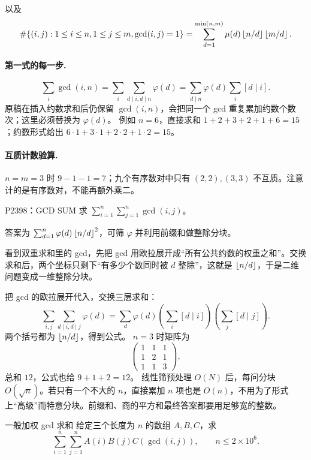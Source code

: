 以及
\[
 \#\{(i,j):1\le i\le n,1\le j\le m,\gcd(i,j)=1\}
 =\sum_{d=1}^{\min(n,m)}\mu(d)\left\lfloor n/d\right\rfloor\left\lfloor m/d\right\rfloor.
\]

\paragraph{第一式的每一步.}
\[
\sum_i\gcd(i,n)
=\sum_i\sum_{d\mid i,d\mid n}\varphi(d)
=\sum_{d\mid n}\varphi(d)\sum_i[d\mid i].
\]
原稿在插入约数求和后仍保留 $\gcd(i,n)$，会把同一个 gcd 重复累加约数个数次；这里必须替换为 $\varphi(d)$。
例如 $n=6$，直接求和 $1+2+3+2+1+6=15$；约数形式给出 $6\cdot1+3\cdot1+2\cdot2+1\cdot2=15$。
\paragraph{互质计数验算.} $n=m=3$ 时 $9-1-1=7$；九个有序数对中只有 $(2,2),(3,3)$ 不互质。注意计的是有序数对，不能再额外乘二。


\begin{problem}{P2398：GCD SUM}
求 $\sum_{i=1}^n\sum_{j=1}^n\gcd(i,j)$。
\end{problem}
\hint 答案为 $\sum_{d=1}^n\varphi(d)\left\lfloor n/d\right\rfloor^2$，可筛 $\varphi$ 并利用前缀和做整除分块。

\begin{pitfall}[讲解：先看这题到底在做什么]
看到双重求和里的 gcd，先把 gcd 用欧拉展开成“所有公共约数的权重之和”。交换求和后，两个坐标只剩下“有多少个数同时被 $d$ 整除”，这就是 $\left\lfloor n/d\right\rfloor$，于是二维问题变成一维整除分块。
\end{pitfall}

\sol 把 gcd 的欧拉展开代入，交换三层求和：
\[
\sum_{i,j}\sum_{d\mid i,d\mid j}\varphi(d)
=\sum_d\varphi(d)\left(\sum_i[d\mid i]\right)
\left(\sum_j[d\mid j]\right).
\]
两个括号都为 $\left\lfloor n/d\right\rfloor$，得到公式。
$n=3$ 时矩阵为
\[
\begin{pmatrix}1&1&1\\1&2&1\\1&1&3\end{pmatrix},
\]
总和 $12$，公式也给 $9+1+2=12$。
\cost 线性筛预处理 $O(N)$ 后，每问分块 $O(\sqrt n)$。若只有一个不大的 $n$，直接累加 $n$ 项也是 $O(n)$，不用为了形式上“高级”而特意分块。前缀和、商的平方和最终答案都要用足够宽的整数。


\begin{problem}{一般加权 gcd 求和}
给定三个长度为 $n$ 的数组 $A,B,C$，求
\[
 \sum_{i=1}^n\sum_{j=1}^n A(i)B(j)C(\gcd(i,j)),\qquad n\le2\times10^6.
\]
\end{problem}

